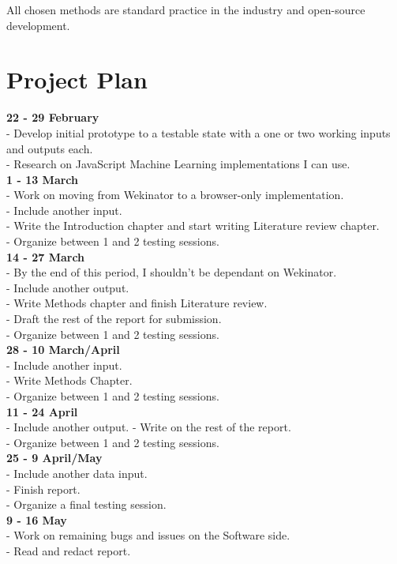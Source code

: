\documentclass[a4paper, 11pt]{article}
\begin{document}
  All chosen methods are standard practice in the industry and open-source development.

  \section{Project Plan}
  \textbf{22 - 29 February} \\
  - Develop initial prototype to a testable state with a one or two working inputs and outputs each. \\
  - Research on JavaScript Machine Learning implementations I can use. \\
  \textbf{1 - 13 March} \\
  - Work on moving from Wekinator to a browser-only implementation. \\
  - Include another input. \\
  - Write the Introduction chapter and start writing Literature review chapter. \\
  - Organize between 1 and 2 testing sessions. \\
  \textbf{14 - 27 March} \\
  - By the end of this period, I shouldn't be dependant on Wekinator. \\
  - Include another output. \\
  - Write Methods chapter and finish Literature review. \\
  - Draft the rest of the report for submission. \\
  - Organize between 1 and 2 testing sessions. \\
  \textbf{28 - 10 March/April} \\
  - Include another input. \\
  - Write Methods Chapter. \\
  - Organize between 1 and 2 testing sessions. \\
  \textbf{11 - 24 April} \\
  - Include another output.
  - Write on the rest of the report. \\
  - Organize between 1 and 2 testing sessions. \\
  \textbf{25 - 9 April/May} \\
  - Include another data input. \\
  - Finish report. \\
  - Organize a final testing session. \\
  \textbf{9 - 16 May} \\
  - Work on remaining bugs and issues on the Software side. \\
  - Read and redact report. \\
\end{document}
